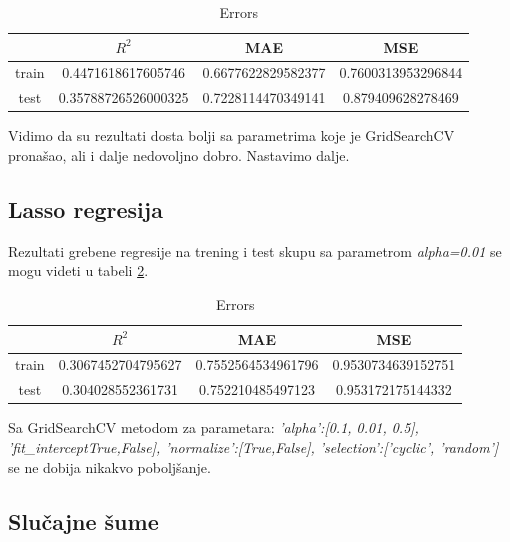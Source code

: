 \documentclass[a4paper]{article}
\begin{document}
\begin{table}[h!]
\caption{Errors}
\centering %
\begin{tabular}{c c c c} %
\hline\hline %
 & ${R}^2$ & MAE & MSE \\ [0.2ex] %
\hline %
train & 0.4471618617605746 & 0.6677622829582377 & 0.7600313953296844 \\ %
test & 0.35788726526000325 & 0.7228114470349141 & 0.879409628278469 \\ [1ex] %
\end{tabular}
\label{table:table_4}
\end{table}

Vidimo da su rezultati dosta bolji sa parametrima koje je GridSearchCV pronašao, ali i dalje nedovoljno dobro. Nastavimo dalje.


\subsection{Lasso regresija}
\label{sec:lasso_1}

Rezultati grebene regresije na trening i test skupu sa parametrom \textit{alpha=0.01} se mogu videti u tabeli \ref{table:table_5}.

\begin{table}[h!]
\caption{Errors}
\centering %
\begin{tabular}{c c c c} %
\hline\hline %
 & ${R}^2$ & MAE & MSE \\ [0.2ex] %
\hline %
train & 0.3067452704795627 & 0.7552564534961796 & 0.9530734639152751 \\ %
test & 0.304028552361731 & 0.752210485497123 & 0.953172175144332 \\ [1ex] %
\end{tabular}
\label{table:table_5}
\end{table}

Sa GridSearchCV metodom za parametara: \textit{'alpha':[0.1, 0.01, 0.5], 'fit\_interceptTrue,False], 'normalize':[True,False], 'selection':['cyclic', 'random']} se ne dobija nikakvo poboljšanje.



\subsection{Slučajne šume}
\label{sec:randomForest_1}
\end{document}
